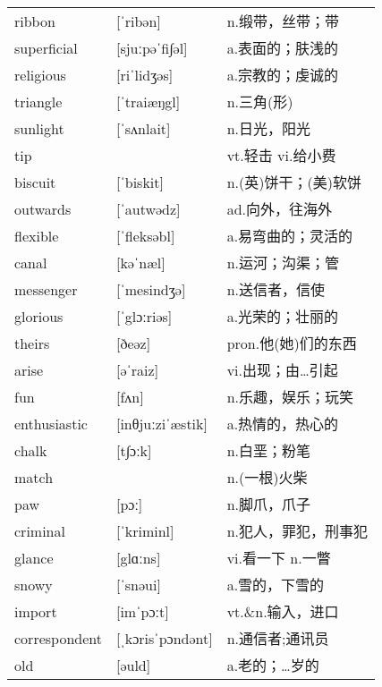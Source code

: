 \documentclass[a4paper]{article}
\begin{document}
\section{}
\begin{tabular}{l l l}

ribbon & [ˈribən] & n.缎带，丝带；带 \\
superficial & [sjuːpəˈfi∫əl] & a.表面的；肤浅的 \\
religious & [riˈlidʒəs] & a.宗教的；虔诚的 \\
triangle & [ˈtraiæŋgl] & n.三角(形) \\
sunlight & [ˈsʌnlait] & n.日光，阳光 \\
tip &  & vt.轻击 vi.给小费 \\
biscuit & [ˈbiskit] & n.(英)饼干；(美)软饼 \\
outwards & [ˈautwədz] & ad.向外，往海外 \\
flexible & [ˈfleksəbl] & a.易弯曲的；灵活的 \\
canal & [kəˈnæl] & n.运河；沟渠；管 \\
messenger & [ˈmesindʒə] & n.送信者，信使 \\
glorious & [ˈglɔːriəs] & a.光荣的；壮丽的 \\
theirs & [ðeəz] & pron.他(她)们的东西 \\
arise & [əˈraiz] & vi.出现；由…引起 \\
fun & [fʌn] & n.乐趣，娱乐；玩笑 \\
enthusiastic & [inθjuːziˈæstik] & a.热情的，热心的 \\
chalk & [t∫ɔːk] & n.白垩；粉笔 \\
match &  & n.(一根)火柴 \\
paw & [pɔː] & n.脚爪，爪子 \\
criminal & [ˈkriminl] & n.犯人，罪犯，刑事犯 \\
glance & [glɑːns] & vi.看一下 n.一瞥 \\
snowy & [ˈsnəui] & a.雪的，下雪的 \\
import & [imˈpɔːt] & vt.\&n.输入，进口 \\
correspondent & [ˌkɔrisˈpɔndənt] & n.通信者;通讯员 \\
old & [əuld] & a.老的；…岁的 \\

\end{tabular}
\end{document}
